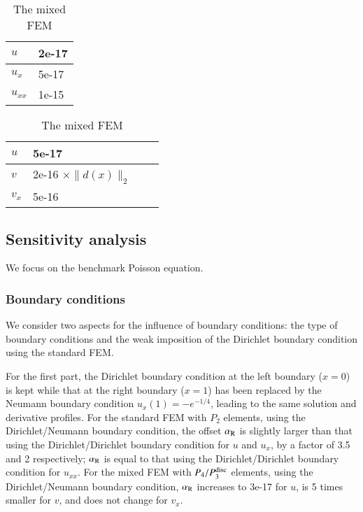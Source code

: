\documentclass[review,3p]{elsarticle}
\begin{document}
\begin{table}[!ht]
\hspace{4.0cm}
\begin{subtable}{0.4\textwidth}
\caption{The standard FEM}
\begin{tabular}{l l}
\hline
$u$ & 2e-17 \\ \hline 
$u_x$ & 5e-17 \\ \hline
$u_{xx}$ & 1e-15 \\ \hline
\end{tabular}
\end{subtable}
\hspace{-2.5cm}
\begin{subtable}{.4\textwidth}
\caption{The mixed FEM}
\begin{tabular}{l l l l}
\hline
$u$ & 5e-17 \\ \hline 
$v$ & 2e-16 $\times \|d(x)\|_2$ \\ \hline
$v_x$ & 5e-16 \\ \hline
\end{tabular}
\end{subtable}
\label{relation_alpha_R_l2_norm_u_du}
\end{table}


\newpage
\subsection{Sensitivity analysis}       \label{section_sensitivity}

We focus on the benchmark Poisson equation.


\subsubsection{Boundary conditions}	\label{section_BC}

We consider two aspects for the influence of boundary conditions: the type of boundary conditions and the weak imposition of the Dirichlet boundary condition using the standard FEM.

For the first part, the Dirichlet boundary condition at the left boundary ($x=0$) is kept while that at the right boundary ($x=1$) has been replaced by the Neumann boundary condition $u_x (1) = -e^{-1/4}$, leading to the same solution and derivative profiles. 
For the standard FEM with $P_2$ elements, using the Dirichlet/Neumann boundary condition, the offset $\alpha_{\rm R}$ is slightly larger than that using the Dirichlet/Dirichlet boundary condition for $u$ and $u_x$, by a factor of 3.5 and 2 respectively; $\alpha_{\rm R}$ is equal to that using the Dirichlet/Dirichlet boundary condition for $u_{xx}$. For the mixed FEM with $P_4/P_3^{\rm disc}$ elements, using the Dirichlet/Neumann boundary condition, $\alpha_{\rm R}$ increases to 3e-17 for $u$, is 5 times smaller for $v$, and does not change for $v_x$.
\end{document}
